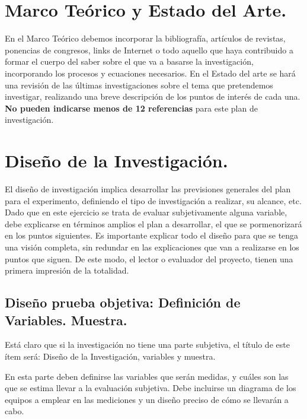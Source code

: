 \documentclass{untref-plan}
\begin{document}
\section{Marco Teórico y Estado del Arte.}

En el Marco Teórico debemos incorporar la bibliografía, artículos de revistas, ponencias de congresos, links de Internet o todo aquello que haya contribuido a formar el cuerpo del saber sobre el que va a basarse la investigación, incorporando los procesos y ecuaciones necesarios. En el Estado del arte se hará una revisión de las últimas investigaciones sobre el tema que pretendemos investigar, realizando una breve descripción de los puntos de interés de cada una. \textbf{No pueden indicarse menos de 12 referencias} para este plan de investigación.

\section{Diseño de la Investigación.}

El diseño de investigación implica desarrollar las previsiones generales del plan para el experimento, definiendo el tipo de investigación a realizar, su alcance, etc. Dado que en este ejercicio se trata de evaluar subjetivamente alguna variable, debe explicarse en términos amplios el plan a desarrollar, el que se pormenorizará en los puntos siguientes. Es importante explicar todo el diseño para que se tenga una visión completa, sin redundar en las explicaciones que van a realizarse en los puntos que siguen. De este modo, el lector o evaluador del proyecto, tienen una primera impresión de la totalidad.

\subsection{Diseño prueba objetiva: Definición de Variables. Muestra.}

Está claro que si la investigación no tiene una parte subjetiva, el título de este ítem será: Diseño de la Investigación, variables y muestra.

En esta parte deben definirse las variables que serán medidas, y cuáles son las que se estima llevar a la evaluación subjetiva. Debe incluirse un diagrama de los equipos a emplear en las mediciones y un diseño preciso de cómo se llevarán a cabo.
\end{document}
